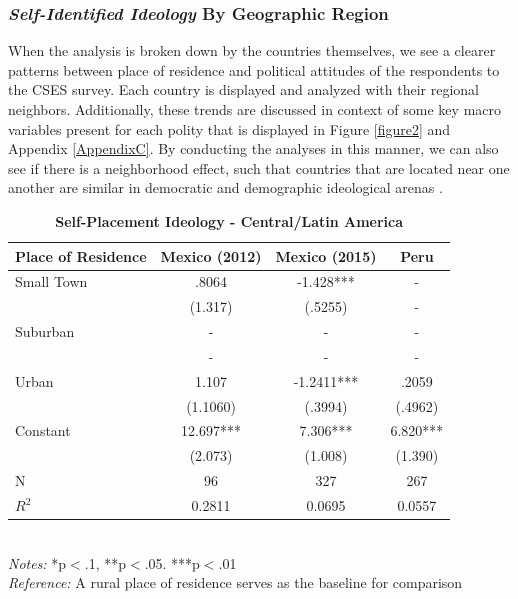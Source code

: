 \documentclass[12pt, titlepage]{article}
\newcommand\e{\emph}
\newcommand\tb{\textbf}
\begin{document}
\subsubsection{\e{Self-Identified Ideology} By Geographic Region}

When the analysis is broken down by the countries themselves, we see a clearer patterns between place of residence and political attitudes of the respondents to the CSES survey. Each country is displayed and analyzed with their regional neighbors. Additionally, these trends are discussed in context of some key macro variables present for each polity that is displayed in Figure \ref{figure2} and Appendix \ref{AppendixC}. By conducting the analyses in this manner, we can also see if there is a neighborhood effect, such that countries that are located near one another are similar in democratic and demographic ideological arenas \citep{brinks2006diffusion}.

\begin{singlespace}
	\begin{table}[H]
		\centering
		\caption{\tb{Self-Placement Ideology - Central/Latin America}}
		\begin{tabulary}{\linewidth}{l c c c}
			\hline
			\tb{Place of Residence}&\tb{Mexico (2012)}&\tb{Mexico (2015)} &\tb{Peru}\\
			\hline
			Small Town  & .8064   &-1.428***    & -   \\      
			 & (1.317) & (.5255)    & -    \\
			Suburban     & -   & -   & -    \\ 
			  & -    & -   & -    \\
			Urban    & 1.107  & -1.2411***   & .2059  \\
			  &(1.1060)   & (.3994)  & (.4962)      \\
			Constant  & 12.697*** & 7.306*** & 6.820***  \\
			&(2.073)&(1.008)&(1.390) \\
			N   &96   & 327 & 267   \\
			$R^2$ & 0.2811   &0.0695   &0.0557     \\
			\hline                   
		\end{tabulary} 
		\\
		\e{Notes:} *p$<$.1, **p$<$.05. ***p$<$.01 \\
		\e{Reference:} A rural place of residence serves as the baseline for comparison
		\label{table4}
	\end{table}
\end{singlespace}
\end{document}
